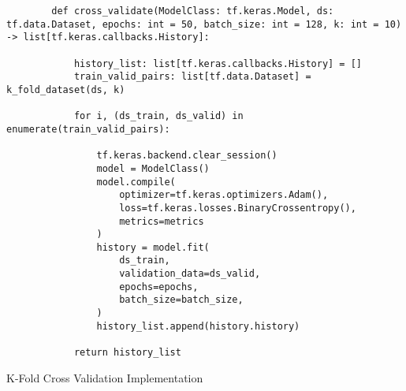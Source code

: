 \begin{listing}[H]
        \begin{verbatim}
        def cross_validate(ModelClass: tf.keras.Model, ds: tf.data.Dataset, epochs: int = 50, batch_size: int = 128, k: int = 10) -> list[tf.keras.callbacks.History]:

            history_list: list[tf.keras.callbacks.History] = []
            train_valid_pairs: list[tf.data.Dataset] = k_fold_dataset(ds, k)
        
            for i, (ds_train, ds_valid) in enumerate(train_valid_pairs):
        
                tf.keras.backend.clear_session()
                model = ModelClass()
                model.compile(
                    optimizer=tf.keras.optimizers.Adam(),
                    loss=tf.keras.losses.BinaryCrossentropy(),
                    metrics=metrics
                )
                history = model.fit(
                    ds_train,
                    validation_data=ds_valid,
                    epochs=epochs,
                    batch_size=batch_size,
                )
                history_list.append(history.history)

            return history_list
        \end{verbatim}
    \caption{K-Fold Cross Validation Implementation}\label{listing:cross-validate}
\end{listing}